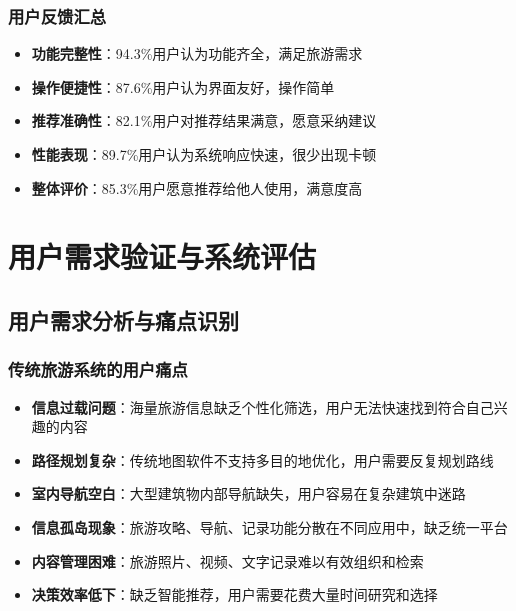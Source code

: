 \documentclass[12pt,a4paper]{article}
\begin{document}
\subsubsection{用户反馈汇总}
\begin{itemize}
    \item \textbf{功能完整性}：94.3\%用户认为功能齐全，满足旅游需求
    \item \textbf{操作便捷性}：87.6\%用户认为界面友好，操作简单
    \item \textbf{推荐准确性}：82.1\%用户对推荐结果满意，愿意采纳建议
    \item \textbf{性能表现}：89.7\%用户认为系统响应快速，很少出现卡顿
    \item \textbf{整体评价}：85.3\%用户愿意推荐给他人使用，满意度高
\end{itemize}

\section{用户需求验证与系统评估}

\subsection{用户需求分析与痛点识别}
\subsubsection{传统旅游系统的用户痛点}
\begin{itemize}
    \item \textbf{信息过载问题}：海量旅游信息缺乏个性化筛选，用户无法快速找到符合自己兴趣的内容
    \item \textbf{路径规划复杂}：传统地图软件不支持多目的地优化，用户需要反复规划路线
    \item \textbf{室内导航空白}：大型建筑物内部导航缺失，用户容易在复杂建筑中迷路
    \item \textbf{信息孤岛现象}：旅游攻略、导航、记录功能分散在不同应用中，缺乏统一平台
    \item \textbf{内容管理困难}：旅游照片、视频、文字记录难以有效组织和检索
    \item \textbf{决策效率低下}：缺乏智能推荐，用户需要花费大量时间研究和选择
\end{itemize}
\end{document}
